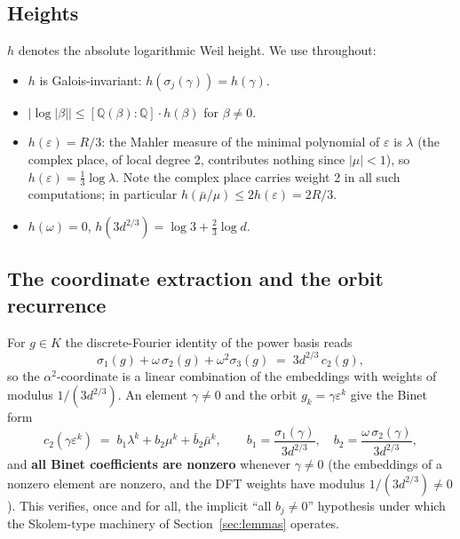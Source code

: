 \documentclass[11pt]{amsart}
\theoremstyle{plain}
\theoremstyle{remark}
\begin{document}
\subsection{Heights}\label{sec:heights}

$h$ denotes the absolute logarithmic Weil height. We use throughout:

\begin{itemize}
\item $h$ is Galois-invariant: $h(\sigma_j(\gamma)) = h(\gamma)$.
\item $|\log|\beta|| \le [\mathbb{Q}(\beta):\mathbb{Q}]\cdot h(\beta)$
  for $\beta \ne 0$.
\item $h(\varepsilon) = R/3$: the Mahler measure of the minimal
  polynomial of $\varepsilon$ is $\lambda$ (the complex place, of
  local degree 2, contributes nothing since $|\mu| < 1$), so
  $h(\varepsilon) = \tfrac13\log\lambda$. Note the complex place
  carries weight 2 in all such computations; in particular
  $h(\bar\mu/\mu) \le 2h(\varepsilon) = 2R/3$.
\item $h(\omega) = 0$, $h(3d^{2/3}) = \log 3 + \tfrac23\log d$.
\end{itemize}

\subsection{The coordinate extraction and the orbit recurrence}
\label{sec:coordinate}

For $g \in K$ the discrete-Fourier identity of the power basis reads
\[
\sigma_1(g) + \omega\,\sigma_2(g) + \omega^2\sigma_3(g) \;=\;
3d^{2/3}\,c_2(g),
\]
so the $\alpha^2$-coordinate is a linear combination of the embeddings
with weights of modulus $1/(3d^{2/3})$. An element $\gamma \ne 0$ and
the orbit $g_k = \gamma\varepsilon^k$ give the Binet form
\[
c_2(\gamma\varepsilon^k) \;=\; b_1\lambda^k + b_2\mu^k
+ \bar b_2\bar\mu^k,
\qquad b_1 = \frac{\sigma_1(\gamma)}{3d^{2/3}},\quad
b_2 = \frac{\omega\,\sigma_2(\gamma)}{3d^{2/3}},
\]
and \textbf{all Binet coefficients are nonzero} whenever
$\gamma \ne 0$ (the embeddings of a nonzero element are nonzero, and
the DFT weights have modulus $1/(3d^{2/3}) \ne 0$). This verifies,
once and for all, the implicit ``all $b_j \ne 0$'' hypothesis under
which the Skolem-type machinery of Section~\ref{sec:lemmas} operates.
\end{document}
